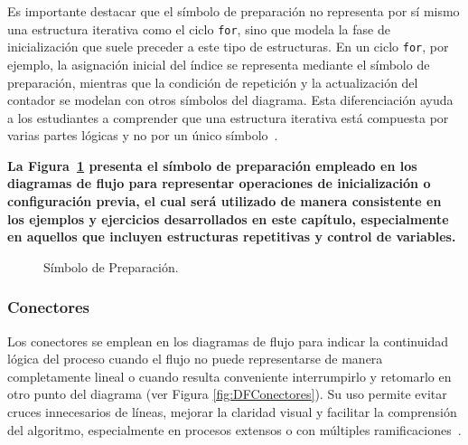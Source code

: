 \documentclass[12pt,twoside]{book}
\begin{document}
						Es importante destacar que el símbolo de preparación no representa por sí mismo una estructura iterativa como el ciclo \texttt{for}, sino que modela la fase de inicialización que suele preceder a este tipo de estructuras. En un ciclo \texttt{for}, por ejemplo, la asignación inicial del índice se representa mediante el símbolo de preparación, mientras que la condición de repetición y la actualización del contador se modelan con otros símbolos del diagrama. Esta diferenciación ayuda a los estudiantes a comprender que una estructura iterativa está compuesta por varias partes lógicas y no por un único símbolo~\cite{Joyanes2007Fundamentos,Kendall2014Systems}.
						
						\textbf{La Figura~\ref{fig:DFPreparacion} presenta el símbolo de preparación empleado en los diagramas de flujo para representar operaciones de inicialización o configuración previa, el cual será utilizado de manera consistente en los ejemplos y ejercicios desarrollados en este capítulo, especialmente en aquellos que incluyen estructuras repetitivas y control de variables.}
						
						\begin{figure}[h]
							\centering
							\caption{Símbolo de Preparación.}
							\label{fig:DFPreparacion}
						\end{figure}
						
					\subsubsection{Conectores}
						Los conectores se emplean en los diagramas de flujo para indicar la continuidad lógica del proceso cuando el flujo no puede representarse de manera completamente lineal o cuando resulta conveniente interrumpirlo y retomarlo en otro punto del diagrama (ver Figura \ref{fig:DFConectores}). Su uso permite evitar cruces innecesarios de líneas, mejorar la claridad visual y facilitar la comprensión del algoritmo, especialmente en procesos extensos o con múltiples ramificaciones~\cite{Joyanes2007Fundamentos,Manzano2017Programacion}.
						
\end{document}
